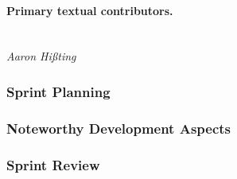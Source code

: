 \paragraph{Primary textual contributors.}
\mbox{}\\\emph{Aaron Hißting}

\subsubsection{Sprint Planning}


\subsubsection{Noteworthy Development Aspects}


\subsubsection{Sprint Review}
